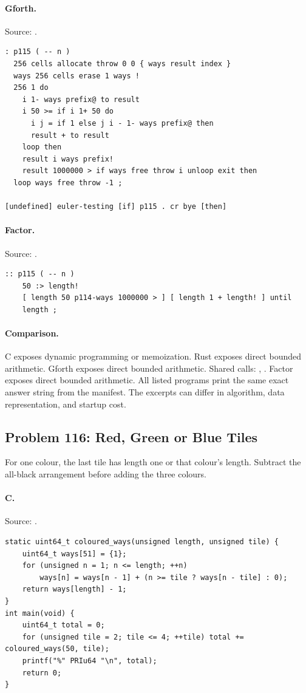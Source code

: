 \paragraph{Gforth.} Source: .
\begin{lstlisting}
: p115 ( -- n )
  256 cells allocate throw 0 0 { ways result index }
  ways 256 cells erase 1 ways !
  256 1 do
    i 1- ways prefix@ to result
    i 50 >= if i 1+ 50 do
      i j = if 1 else j i - 1- ways prefix@ then
      result + to result
    loop then
    result i ways prefix!
    result 1000000 > if ways free throw i unloop exit then
  loop ways free throw -1 ;

[undefined] euler-testing [if] p115 . cr bye [then]
\end{lstlisting}

\paragraph{Factor.} Source: .
\begin{lstlisting}
:: p115 ( -- n )
    50 :> length!
    [ length 50 p114-ways 1000000 > ] [ length 1 + length! ] until
    length ;
\end{lstlisting}

\paragraph{Comparison.}
C exposes dynamic programming or memoization. Rust exposes direct bounded arithmetic. Gforth exposes direct bounded arithmetic. Shared calls: \texttt{}, \texttt{}. Factor exposes direct bounded arithmetic.
All listed programs print the same exact answer string from the manifest. The excerpts can differ in algorithm, data representation, and startup cost.

\subsection{Problem 116: Red, Green or Blue Tiles}
\label{walkthrough:p116}
For one colour, the last tile has length one or that colour's length. Subtract the all-black arrangement before adding the three colours.

\paragraph{C.} Source: .
\begin{lstlisting}
static uint64_t coloured_ways(unsigned length, unsigned tile) {
    uint64_t ways[51] = {1};
    for (unsigned n = 1; n <= length; ++n)
        ways[n] = ways[n - 1] + (n >= tile ? ways[n - tile] : 0);
    return ways[length] - 1;
}
int main(void) {
    uint64_t total = 0;
    for (unsigned tile = 2; tile <= 4; ++tile) total += coloured_ways(50, tile);
    printf("%" PRIu64 "\n", total);
    return 0;
}
\end{lstlisting}


